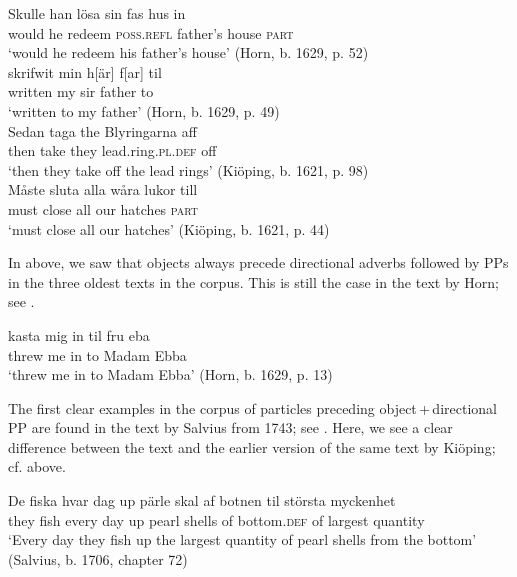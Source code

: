 \documentclass[output=paper]{langscibook}
\begin{document}
\ea\label{ex:lalu:40}
\ea\label{ex:lalu:40a}
\gll  Skulle  han   lösa     sin         fas       hus in\\
    would  he   redeem   \textsc{poss.refl}   father’s   house   \textsc{part}\\
\glt `would he redeem his father’s house’ (Horn, b. 1629, p. 52)\\

\ex\label{ex:lalu:40b}
\gll  skrifwit   min   h[är] f[ar] til\\
    written   my   sir   father   to \\
\glt `written to my father’ (Horn, b. 1629, p. 49)\\
\z
\ex\label{ex:lalu:41}
\ea
\gll  Sedan   taga   the     Blyringarna     aff\\
    then     take   they   lead.ring.\textsc{pl.def}   off\\
\glt `then they take off the lead rings’ (Kiöping, b. 1621, p. 98)\\

\ex
\gll  Måste   sluta     alla   wåra   lukor     till \\
    must     close     all   our   hatches   \textsc{part}\\
\glt `must close all our hatches’ (Kiöping, b. 1621, p. 44)\\
\z
\z


In  above, we saw that objects always precede directional adverbs followed by PPs in the three oldest texts in the corpus. This is still the case in the text by Horn; see .


\ea\label{ex:lalu:42}
\gll  kasta     mig   in     til     fru     eba\\
threw       me   in     to     Madam   Ebba\\
\glt `threw me in to Madam Ebba’ (Horn, b. 1629, p. 13)\\
\z

\begin{sloppypar}
The first clear examples in the corpus of particles preceding object\,+\,directional PP are found in the text by Salvius from 1743; see . Here, we see a clear difference between the  text and the earlier version of the same text by Kiöping; cf.  above.
\end{sloppypar}

\ea\label{ex:lalu:43}
\gll  De {fiska} {hvar}     {dag} {up} {pärle} {skal} {af} {botnen} {til} {största} {myckenhet}\\
they   fish     every   day     up     pearl   shells   of     bottom\textsc{.def} of     largest     quantity\\
\glt `Every day they fish up the largest quantity of pearl shells from the bottom'   (Salvius, b. 1706, chapter 72)\\
\z
\end{document}
